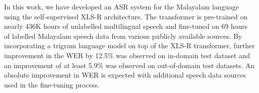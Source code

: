 \documentclass[runningheads]{llncs}
\begin{document}
In this work, we have developed an ASR system for the Malayalam language using the self-supervised XLS-R architecture. The transformer is pre-trained on nearly 436K hours of unlabelled multilingual speech and fine-tuned on 69 hours of labelled Malayalam speech data from various publicly available sources. By incorporating a trigram language model on top of the XLS-R transformer, further improvement in the WER by  12.5\% was observed  on in-domain test dataset and an improvement of at least 5.9\% was observed on out-of-domain test datasets. An absolute improvement in WER is expected with additional speech data sources used in the fine-tuning process.







\end{document}
